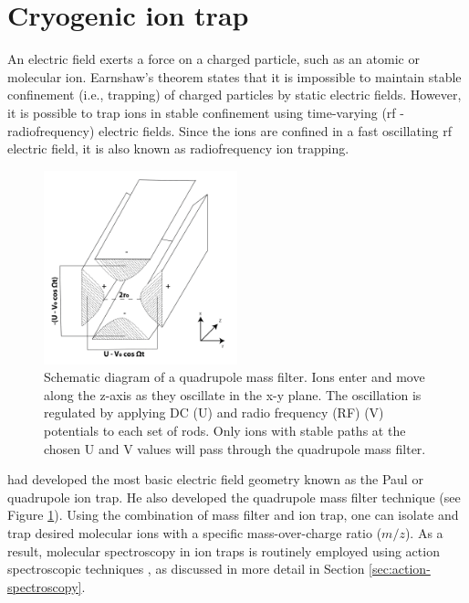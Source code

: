 \section{Cryogenic ion trap}

An electric field exerts a force on a charged particle, such as an atomic or molecular ion. Earnshaw's \cite{earnshaw_nature_1848} theorem states that it is impossible to maintain stable confinement (i.e., trapping) of charged particles by static electric fields. However, it is possible to trap ions in stable confinement using time-varying (rf - radiofrequency) electric fields. Since the ions are confined in a fast oscillating rf electric field, it is also known as radiofrequency ion trapping.

\begin{figure}[!htb]
    \centering
    \includegraphics[width=0.5\textwidth]{figures/intro/trap/Quadrupole.png}
    \caption{Schematic diagram of a quadrupole mass filter. Ions enter and move along the z-axis as they oscillate in the x-y plane. The oscillation is regulated by applying DC (U) and radio frequency (RF) (V) potentials to each set of rods. Only ions with stable paths at the chosen U and V values will pass through the quadrupole mass filter.}
    \label{fig:quadrupole}
\end{figure}

\citet{paul_ionenka_1955} had developed the most basic electric field geometry known as the Paul or quadrupole ion trap. He also developed the quadrupole mass filter technique \cite{paul_elektrische_1955} (see Figure \ref{fig:quadrupole}). Using the combination of mass filter and ion trap, one can isolate and trap desired molecular ions with a specific mass-over-charge ratio ($m/z$). As a result, molecular spectroscopy in ion traps is routinely employed using action spectroscopic techniques \cite{SA2019, Roithovareview, Asvany2021}, as discussed in more detail in Section \ref{sec:action-spectroscopy}.

